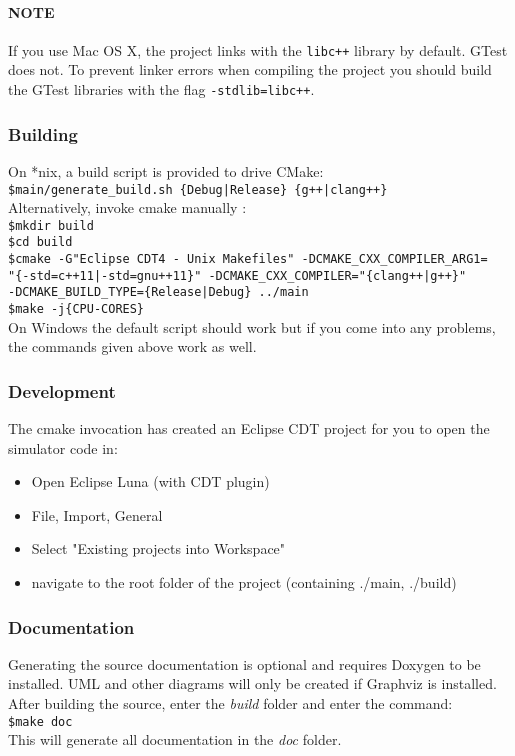 \paragraph{NOTE} If you use Mac OS X, the project links with the \texttt{libc++} library by default. GTest does not. To prevent linker errors when compiling the project you should build the GTest libraries with the flag \texttt{-stdlib=libc++}.
\subsubsection{Building}
On *nix, a build script is provided to drive CMake:\\
\texttt{\$main/generate\_build.sh \{Debug|Release\} \{g++|clang++\} }\\
Alternatively, invoke cmake manually : \\
\texttt{\$mkdir build }\\
\texttt{\$cd build}\\
\texttt{\$cmake -G"Eclipse CDT4 - Unix Makefiles" -DCMAKE\_CXX\_COMPILER\_ARG1=\\"\{-std=c++11|-std=gnu++11\}" -DCMAKE\_CXX\_COMPILER="\{clang++|g++\}" \\-DCMAKE\_BUILD\_TYPE=\{Release|Debug\} ../main}\\
\texttt{\$make -j\{CPU-CORES\}}\\

On Windows the default script should work but if you come into any problems, the commands given above work as well.
\subsubsection{Development}
The cmake invocation has created an Eclipse CDT project for you to open the simulator code in:
\begin{itemize}
  \item Open Eclipse Luna (with CDT plugin)
  \item File, Import, General
  \item Select "Existing projects into Workspace"
  \item navigate to the root folder of the project (containing ./main, ./build)
\end{itemize}

\subsubsection{Documentation}
Generating the source documentation is optional and requires Doxygen to be installed. UML and other diagrams will only be created if Graphviz is installed.\\
After building the source, enter the \textsl{build} folder and enter the command:\\
\texttt{\$make doc}\\This will generate all documentation in the \textsl{doc} folder.